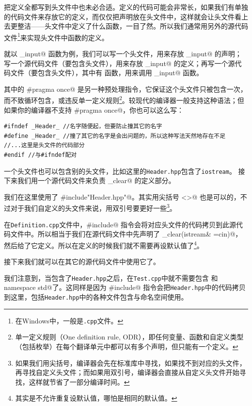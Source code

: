 把定义全都写到头文件中也未必合适。定义的代码可能会非常长，如果我们有单独的代码文件来存放它的定义，而仅仅把声明放在头文件中，这样就会让头文件看上去更整洁——头文件中定义了什么函数，一目了然。所以我们通常用另外的源代码文件\footnote{在Windows中，一般是\texttt{.cpp}文件。}来实现头文件中函数的定义。\par
就以 \lstinline@clear_input@ 函数为例，我们可以写一个头文件，用来存放 \lstinline@clear_input@ 的声明；写一个源代码文件（要包含头文件），用来存放 \lstinline@clear_input@ 的定义；再写一个源代码文件（要包含头文件），其中有 \lstinline@main@ 函数，用来调用 \lstinline@clear_input@ 函数。\par

其中的 \lstinline@#pragma once@ 是另一种预处理指令，它保证这个头文件只被包含一次，而不致循环包含，或违反单一定义规则\footnote{单一定义规则（One definition rule, ODR），即任何变量、函数和自定义类型（包括枚举）在每个翻译单元中都可以有多个声明，但只能有一个定义。}。较现代的编译器一般支持这种语法；但如果你的编译器不支持 \lstinline@#pragma once@，你也可以这么写：
\begin{lstlisting}
#ifndef _Header_ //名字随便起，但要防止撞其它的名字
#define _Header_ //撞了其它的名字是会出问题的，所以这种写法天然地存在不足
//...这里是头文件的代码部分
#endif //与#ifndef配对
\end{lstlisting}\par
一个头文件也可以包含别的头文件，比如这里的\texttt{Header.hpp}包含了\texttt{iostream}。
接下来我们用一个源代码文件来负责 \lstinline@input_clear@ 的定义部分。

我们在这里使用了 \lstinline@#include"Header.hpp"@。其实用尖括号 \lstinline@<>@ 也是可以的，不过对于我们自定义的头文件来说，用双引号要更好一些\footnote{如果我们用尖括号，编译器会先在标准库中寻找，如果找不到对应的头文件，再寻找自定义头文件；而如果用双引号，编译器会直接从自定义头文件开始寻找，这样就节省了一部分编译时间。}。\par
在\texttt{Definition.cpp}文件中，\lstinline@#include@ 指令会将对应头文件的代码拷贝到此源代码文件中。所以相当于我们在源代码文件中先声明了 \lstinline@input_clear(istream& ={cin})@，然后给了它定义。所以在定义的时候我们就不需要再设默认值了\footnote{其实是不允许重复设默认值，哪怕是相同的默认值。}。\par
接下来我们就可以在其它的源代码文件中使用它了。

我们注意到，当包含了\texttt{Header.hpp}之后，在\texttt{Test.cpp}中就不需要包含 \lstinline@iostream@ 和\linebreak\lstinline@using namespace std@了。这同样是因为 \lstinline@#include@ 指令会把\texttt{Header.hpp}中的代码拷贝到这里，包括\texttt{Header.hpp}中的各种文件包含与命名空间使用。\par
